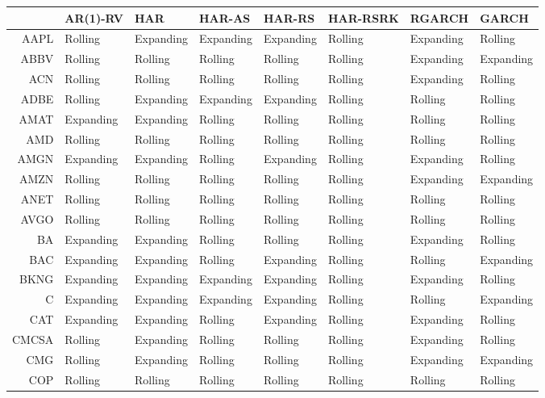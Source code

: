 \begin{table}[ht]
\centering
\begin{tabular}{rlllllll}
  \hline
 & AR(1)-RV & HAR & HAR-AS & HAR-RS & HAR-RSRK & RGARCH & GARCH \\ 
  \hline
AAPL & Rolling & Expanding & Expanding & Expanding & Rolling & Expanding & Rolling \\ 
  ABBV & Rolling & Rolling & Rolling & Rolling & Rolling & Expanding & Expanding \\ 
  ACN & Rolling & Rolling & Rolling & Rolling & Rolling & Expanding & Rolling \\ 
  ADBE & Rolling & Expanding & Expanding & Expanding & Rolling & Rolling & Rolling \\ 
  AMAT & Expanding & Expanding & Rolling & Rolling & Rolling & Rolling & Rolling \\ 
  AMD & Rolling & Rolling & Rolling & Rolling & Rolling & Rolling & Rolling \\ 
  AMGN & Expanding & Expanding & Rolling & Expanding & Rolling & Expanding & Rolling \\ 
  AMZN & Rolling & Rolling & Rolling & Rolling & Rolling & Expanding & Expanding \\ 
  ANET & Rolling & Rolling & Rolling & Rolling & Rolling & Rolling & Rolling \\ 
  AVGO & Rolling & Rolling & Rolling & Rolling & Rolling & Rolling & Rolling \\ 
  BA & Expanding & Expanding & Rolling & Rolling & Rolling & Expanding & Rolling \\ 
  BAC & Expanding & Expanding & Rolling & Expanding & Rolling & Rolling & Expanding \\ 
  BKNG & Expanding & Expanding & Expanding & Expanding & Rolling & Expanding & Rolling \\ 
  C & Expanding & Expanding & Expanding & Expanding & Rolling & Rolling & Expanding \\ 
  CAT & Expanding & Expanding & Rolling & Expanding & Rolling & Expanding & Rolling \\ 
  CMCSA & Rolling & Expanding & Rolling & Rolling & Rolling & Expanding & Rolling \\ 
  CMG & Rolling & Expanding & Rolling & Rolling & Rolling & Expanding & Expanding \\ 
  COP & Rolling & Rolling & Rolling & Rolling & Rolling & Rolling & Rolling \\ 

\end{tabular}
\end{table}
